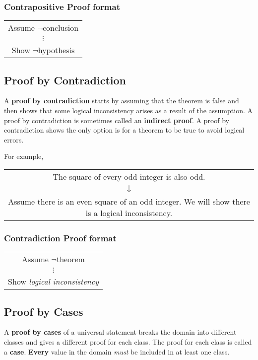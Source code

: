 \subsubsection*{Contrapositive Proof format}
\begin{center}
  \begin{tabular}{|c|}
    \hline
    Assume $\lnot$conclusion \\
    $\vdots$                 \\
    Show $\lnot$hypothesis   \\
    \hline
  \end{tabular}
\end{center}

\subsection{Proof by Contradiction}
A \textbf{proof by contradiction} starts by assuming that the theorem is false and then shows
that some logical inconsistency arises as a result of the assumption.
A proof by contradiction is sometimes called an \textbf{indirect proof}.
A proof by contradiction shows the only option is for a theorem to be true to avoid logical errors.

For example,
\begin{center}
  \begin{tabular}{c}
    The square of every odd integer is also odd. \\
    $\downarrow$                                 \\
    Assume there is an even square of an odd integer. We will show there is a logical inconsistency.
  \end{tabular}
\end{center}
\subsubsection*{Contradiction Proof format}
\begin{center}
  \begin{tabular}{|c|}
    \hline
    Assume $\lnot$theorem               \\
    $\vdots$                            \\
    Show \textit{logical inconsistency} \\
    \hline
  \end{tabular}
\end{center}

\subsection{Proof by Cases}
A \textbf{proof by cases} of a universal statement breaks the domain into different classes
and gives a different proof for each class. The proof for each class is called a \textbf{case}.
\textbf{Every} value in the domain \textit{must} be included in at least one class.

